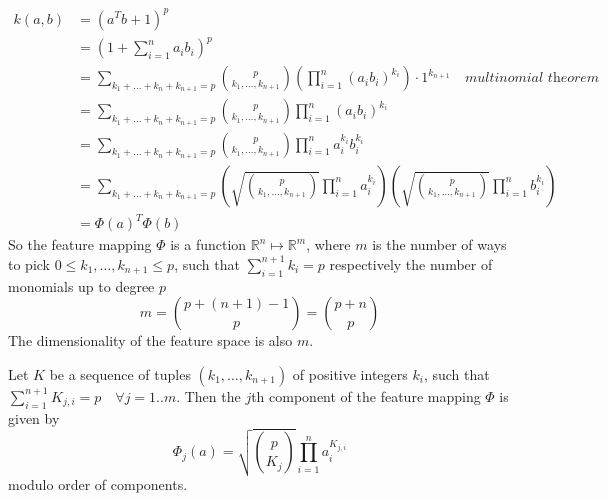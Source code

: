 \documentclass[10pt,a4paper]{article}
\begin{document}
\begin{align*}
  k(a, b) & = (a^{T}b + 1)^{p}\\
          & = \left( 1 + \sum_{i = 1}^{n} a_{i}b_{i} \right)^{p}\\
          & = \sum_{k_{1} + \dots + k_{n} + k_{n + 1} = p} \binom{p}{k_{1}, \dots, k_{n + 1}} \left( \prod_{i = 1}^{n} (a_{i}b_{i})^{k_{i}} \right) \cdot 1^{k_{n + 1}} \quad \textit{multinomial theorem}\\
          & = \sum_{k_{1} + \dots + k_{n} + k_{n + 1} = p} \binom{p}{k_{1}, \dots, k_{n + 1}} \prod_{i = 1}^{n} (a_{i}b_{i})^{k_{i}}\\
          & = \sum_{k_{1} + \dots + k_{n} + k_{n + 1} = p} \binom{p}{k_{1}, \dots, k_{n + 1}} \prod_{i = 1}^{n} a_{i}^{k_{i}}b_{i}^{k_{i}}\\
          & = \sum_{k_{1} + \dots + k_{n} + k_{n + 1} = p} \left( \sqrt{\binom{p}{k_{1}, \dots, k_{n + 1}}} \prod_{i = 1}^{n} a_{i}^{k_{i}} \right) \left( \sqrt{\binom{p}{k_{1}, \dots, k_{n + 1}}} \prod_{i = 1}^{n} b_{i}^{k_{i}} \right)\\
          & = \Phi(a)^{T}\Phi(b)
\end{align*}
So the feature mapping $\Phi$ is a function
$\mathbb{R}^{n} \mapsto \mathbb{R}^{m}$, where $m$ is the number of ways to pick
$0 \le k_{1}, \dots, k_{n + 1} \le p$, such that
$\sum_{i = 1}^{n + 1} k_{i} = p$ respectively the number of monomials up to
degree $p$
\begin{equation}
  m = \binom{p + (n + 1) - 1}{p} = \binom{p + n}{p}
\end{equation}
The dimensionality of the feature space is also $m$.

Let $K$ be a sequence of tuples $(k_{1}, \dots, k_{n + 1})$ of positive integers
$k_{i}$, such that $\sum_{i = 1}^{n + 1}K_{j, i} = p \quad \forall j = 1..m$. Then
the $j$th component of the feature mapping $\Phi$ is given by
\begin{equation}
  \Phi_{j}(a) = \sqrt{\binom{p}{K_{j}}} \prod_{i = 1}^{n} a_{i}^{K_{j, i}}
\end{equation}
modulo order of components.
\end{document}
